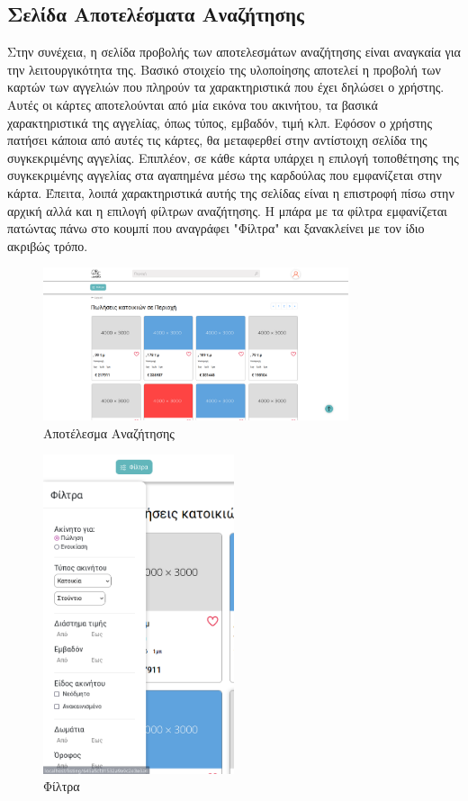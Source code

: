 \documentclass{acmart}
\begin{document}
\subsection*{Σελίδα Αποτελέσματα Αναζήτησης}
Στην συνέχεια, η σελίδα προβολής των αποτελεσμάτων αναζήτησης είναι αναγκαία για την λειτουργικότητα της. Βασικό στοιχείο της υλοποίησης αποτελεί η προβολή των καρτών των αγγελιών που πληρούν τα χαρακτηριστικά που έχει δηλώσει ο χρήστης. Αυτές οι κάρτες αποτελούνται από μία εικόνα του ακινήτου, τα βασικά χαρακτηριστικά της αγγελίας, όπως τύπος, εμβαδόν, τιμή κλπ. Εφόσον ο χρήστης πατήσει κάποια από αυτές τις κάρτες, θα μεταφερθεί στην αντίστοιχη σελίδα της συγκεκριμένης αγγελίας. Επιπλέον, σε κάθε κάρτα υπάρχει η επιλογή τοποθέτησης της συγκεκριμένης αγγελίας στα αγαπημένα μέσω της καρδούλας που εμφανίζεται στην κάρτα.
Έπειτα, λοιπά χαρακτηριστικά αυτής της σελίδας είναι η επιστροφή πίσω στην αρχική αλλά και η επιλογή φίλτρων αναζήτησης. Η μπάρα με τα φίλτρα εμφανίζεται πατώντας πάνω στο κουμπί που αναγράφει "Φίλτρα" και ξανακλείνει με τον ίδιο ακριβώς τρόπο.
\begin{figure}[H]
       \includegraphics[width=0.8\textwidth]{search_page.png}
       \caption{Αποτέλεσμα Αναζήτησης}
       \label{fig:events}
\end{figure}
\begin{figure}[H]
       \includegraphics[width=0.5\textwidth]{filter.png}
       \caption{Φίλτρα}
       \label{fig:edit}
\end{figure}
\end{document}
